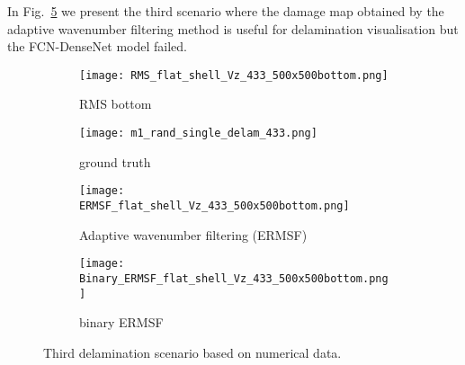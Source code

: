 
In Fig.~\ref{fig:RMS433} we present the third scenario where the damage map obtained by the adaptive wavenumber filtering method is useful for delamination visualisation but the FCN-DenseNet model failed.
\begin{figure}[!h]
	\centering
	\begin{subfigure}[b]{0.47\textwidth}
		\centering
		\texttt{[image: RMS\_flat\_shell\_Vz\_433\_500x500bottom.png]}
		\caption{RMS bottom}
		\label{fig:RMS_flat_shell_Vz_433}
	\end{subfigure}
	\hfill
	\begin{subfigure}[b]{0.47\textwidth}
		\centering
		\texttt{[image: m1\_rand\_single\_delam\_433.png]}
		\caption{ground truth}
		\label{fig:m1_rand_single_delam_433}
	\end{subfigure}
	\hfill
	\begin{subfigure}[b]{0.47\textwidth}
		\centering
		\texttt{[image: ERMSF\_flat\_shell\_Vz\_433\_500x500bottom.png]}
		\caption{Adaptive wavenumber filtering (ERMSF)}
		\label{fig:ERMSF_flat_shell_Vz_433}
	\end{subfigure}
	\hfill
	\begin{subfigure}[b]{0.47\textwidth}
		\centering
		\texttt{[image: Binary\_ERMSF\_flat\_shell\_Vz\_433\_500x500bottom.png]}
		\caption{binary ERMSF}
		\label{fig:Binary_ERMSF_flat_shell_Vz_433}
	\end{subfigure}
	\caption{Third delamination scenario based on numerical data.}
	\label{fig:RMS433}
\end{figure} 

